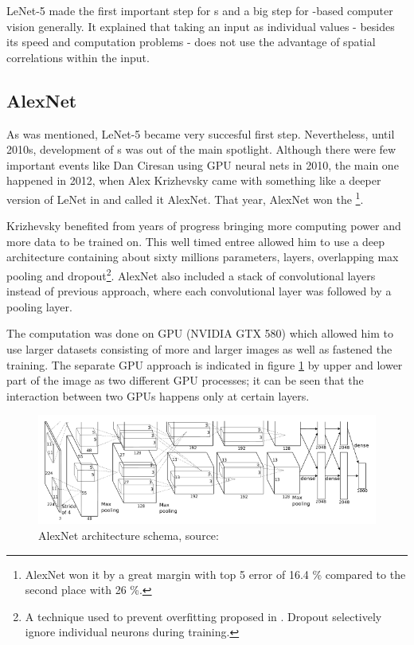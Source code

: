 LeNet-5 made the first important step for s and a big step for -based computer vision generally. It explained that taking an input as individual values - besides its speed and computation problems - does not use the advantage of spatial correlations within the input. 



\subsection{AlexNet} %
\label{alexnet}

As was mentioned, LeNet-5 became very succesful first step. Nevertheless, until 2010s, development of s was out of the main spotlight. Although there were few important events like Dan Ciresan using GPU neural nets in 2010, the main one happened in 2012, when Alex Krizhevsky came with something like a deeper version of LeNet in \cite{cnn-classification} and called it AlexNet. That year, AlexNet won the \footnote{AlexNet won it by a great margin with top 5 error of 16.4 \% compared to the second place with 26 \%.}.

Krizhevsky benefited from years of progress bringing more computing power and more data to be trained on. This well timed entree allowed him to use a deep architecture containing about sixty millions parameters,  layers, overlapping max pooling and dropout\footnote{A technique used to prevent overfitting proposed in \cite{dropout}. Dropout selectively ignore individual neurons during training.}. AlexNet also included a stack of convolutional layers instead of previous approach, where each convolutional layer was followed by a pooling layer. 

The computation was done on GPU (NVIDIA GTX 580) which allowed him to use larger datasets consisting of more and larger images as well as fastened the training. The separate GPU approach is indicated in figure \ref{fig:alexnet} by upper and lower part of the image as two different GPU processes; it can be seen that the interaction between two GPUs happens only at certain layers. 

\begin{figure}[H]
   \centering
	\includegraphics[width=\linewidth]{./pictures/alexnet.png}
	\caption[AlexNet architecture]{AlexNet architecture schema, source: \cite{cnn-classification}}
      \label{fig:alexnet}
\end{figure}

